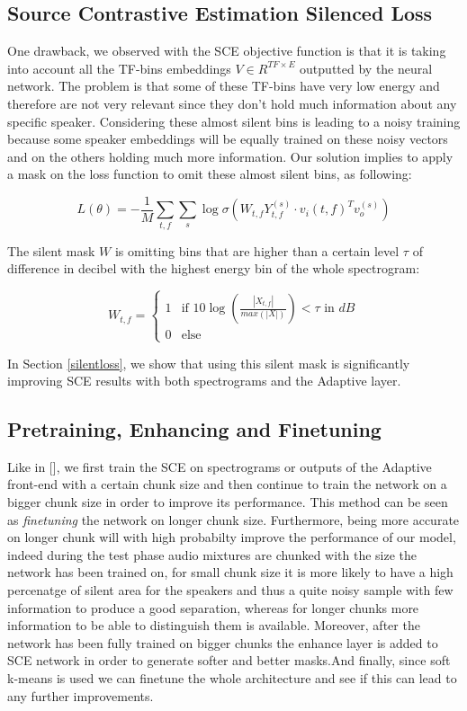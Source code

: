 \documentclass[master,final,11pt]{iscs-thesis}
\begin{document}
\subsection{Source Contrastive Estimation Silenced Loss}

One drawback, we observed with the SCE objective function is that it is taking into account all the TF-bins embeddings $V \in R^{TF\times E}$ outputted by the neural network. The problem is that some of these TF-bins have very low energy and therefore are not very relevant since they don't hold much information about any specific speaker. Considering these almost silent bins is leading to a noisy training because some speaker embeddings will be equally trained on these noisy vectors and on the others holding much more information. Our solution implies to apply a mask on the loss function to omit these almost silent bins, as following:

\[L(\theta) = - \frac{1}{M} \sum_{t,f} \sum_{s} \log \sigma(W_{t,f}Y_{t,f}^{(s)}  \cdot v_i(t,f)^{T} v_o^{(s)})\]

The silent mask $W$ is omitting bins that are higher than a certain level $\tau$ of difference in decibel with the highest energy bin of the whole spectrogram:

$$
W_{t,f} =  \left\{
    \begin{array}{ll}
        1 & \mbox{if } 10\log (\frac{|X_{t,f}|}{max(|X|)}) < \tau \mbox{ in } dB  \\
        0 & \mbox{else}
    \end{array}
\right.
$$

In Section \ref{silentloss}, we show that using this silent mask is significantly improving SCE results with both spectrograms and the Adaptive layer.

\subsection{Pretraining, Enhancing and Finetuning}

Like in [], we first train the SCE on spectrograms or outputs of the Adaptive front-end with a certain chunk size and then continue to train the network on a bigger chunk size in order to improve its performance. This method can be seen as \textit{finetuning} the network on longer chunk size. Furthermore, being more accurate on longer chunk will with high probabilty improve the performance of our model, indeed during the test phase audio mixtures are chunked with the size the network has been trained on, for small chunk size it is more likely to have a high percenatge of silent area for the speakers and thus a quite noisy sample with few information to produce a good separation, whereas for longer chunks more information to be able to distinguish them is available.
Moreover, after the network has been fully trained on bigger chunks the enhance layer is added to SCE network in order to generate softer and better masks.And finally, since soft k-means is used we can finetune the whole architecture and see if this can lead to any further improvements.
\end{document}
